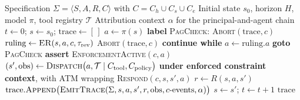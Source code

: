 \documentclass[11pt,a4paper]{article}
\theoremstyle{remark}
\begin{document}
\begin{algorithm}[!htbp]
\caption{SARC-Governed Agent Loop}
\label{alg:loop}
\begin{algorithmic}[1]
\Require Specification $\Sigma = \langle S, A, R, C \rangle$ with $C = C_h \cup C_s \cup C_e$
\Require Initial state $s_0$, horizon $H$, model $\pi$, tool registry $\mathcal{T}$
\Require Attribution context $\alpha$ for the principal-and-agent chain
\State $t \gets 0$; $s \gets s_0$; $\text{trace} \gets [\,]$
    \State $a \gets \pi(s)$ 
    \State \textbf{label} \textsc{PagCheck}: 
            \State \Return \textsc{Abort}$(\text{trace}, c)$ 
        \EndIf
    \EndFor
            \State $\text{ruling} \gets \textsc{ER}(s, a, c, \tau_{\text{rev}})$ 
             \State \Return \textsc{Abort}$(\text{trace}, c)$ 
             \State \textbf{continue while} 
                \State $a \gets \text{ruling}.a$
                \State \textbf{goto} \textsc{PagCheck} 
            \EndIf
        \EndIf
    \EndFor
        \State \textbf{assert} \textsc{EnforcementActive}$(c, a)$ 
    \EndFor
    \State $(s', \text{obs}) \gets \textsc{Dispatch}\bigl(a, \mathcal{T} \mid C_{\text{tool}}, C_{\text{policy}}\bigr)$ \textbf{under enforced constraint context}, with ATM wrapping
            \State \textsc{Respond}$(c, s, s', a)$
        \EndIf
    \EndFor
    \State $r \gets R(s, a, s')$
    \State $\text{trace}.\textsc{Append}\bigl(\textsc{EmitTrace}(\Sigma, s, a, s', r, \text{obs}, c\text{-events}, \alpha)\bigr)$ 
    \State $s \gets s'$; $t \gets t + 1$
\EndWhile
\State \Return $\text{trace}$
\end{algorithmic}
\end{algorithm}
\end{document}
